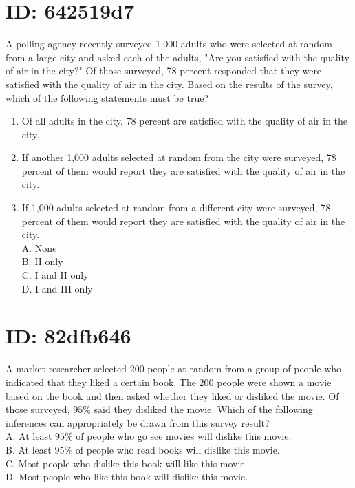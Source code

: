 \section*{ID: 642519d7}
A polling agency recently surveyed 1,000 adults who were selected at random from a large city and asked each of the adults, "Are you satisfied with the quality of air in the city?" Of those surveyed, 78 percent responded that they were satisfied with the quality of air in the city. Based on the results of the survey, which of the following statements must be true?

\begin{enumerate}
  \item Of all adults in the city, 78 percent are satisfied with the quality of air in the city.
  \item If another 1,000 adults selected at random from the city were surveyed, 78 percent of them would report they are satisfied with the quality of air in the city.
  \item If 1,000 adults selected at random from a different city were surveyed, 78 percent of them would report they are satisfied with the quality of air in the city.\\
A. None\\
B. II only\\
C. I and II only\\
D. I and III only
\end{enumerate}

\section*{ID: 82dfb646}
A market researcher selected 200 people at random from a group of people who indicated that they liked a certain book. The 200 people were shown a movie based on the book and then asked whether they liked or disliked the movie. Of those surveyed, $95 \%$ said they disliked the movie. Which of the following inferences can appropriately be drawn from this survey result?\\
A. At least $95 \%$ of people who go see movies will dislike this movie.\\
B. At least $95 \%$ of people who read books will dislike this movie.\\
C. Most people who dislike this book will like this movie.\\
D. Most people who like this book will dislike this movie.

